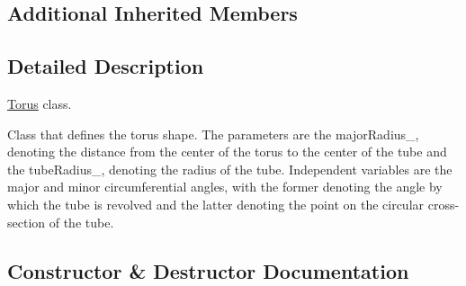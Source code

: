 \subsection*{Additional Inherited Members}


\subsection{Detailed Description}
\hyperlink{classtudat_1_1geometric__shapes_1_1Torus}{Torus} class. 

Class that defines the torus shape. The parameters are the major\+Radius\+\_\+, denoting the distance from the center of the torus to the center of the tube and the tube\+Radius\+\_\+, denoting the radius of the tube. Independent variables are the major and minor circumferential angles, with the former denoting the angle by which the tube is \textquotesingle{}revolved\textquotesingle{} and the latter denoting the point on the circular cross-\/section of the tube. 

\subsection{Constructor \& Destructor Documentation}

